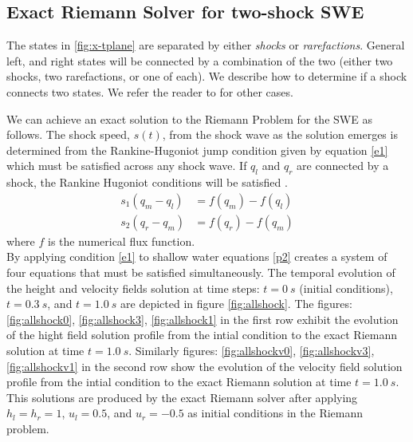 \documentclass[10pt,a4paper]{article}
\begin{document}
	

	\subsection{Exact Riemann Solver for two-shock SWE}
The states in \ref{fig:x-tplane} are separated by either {\em shocks} or {\em rarefactions}. General left, and right states will be connected by a combination of the two (either two shocks, two rarefactions, or one of each).  We describe how to determine if a shock connects two states.  We refer the reader to \cite{leveque2002finite} for other cases. 

We can achieve an exact solution to the Riemann Problem for the SWE as follows. 
The shock speed, $s(t)$,  from the shock wave as the solution emerges is determined from the Rankine-Hugoniot jump condition given by equation \eqref{e1}  which must be satisfied across any shock wave.  If $q_l$ and $q_r$ are connected by a shock, the Rankine Hugoniot conditions will be satisfied \cite{ma-ah-be-ca-ge-ha-ke-le-le:2016}. 
	\begin{equation}
		\begin{aligned}
			s_1(q_{m} - q_{l}) & = f(q_{m}) - f(q_{l}) \\
			s_2(q_{r} - q_{m}) & = f(q_{r}) - f(q_{m})
		\end{aligned}
		\label{e1}
	\end{equation}
where $f$ is the numerical flux function. \\

By applying condition  \eqref{e1} to shallow water equations \eqref{p2}  creates a system of four equations that must be satisfied simultaneously. The temporal evolution of the height and velocity fields solution at time steps: $t=0~s$ (initial conditions), $t = 0.3~s$, and $t = 1.0~s$ are  depicted in figure \ref{fig:allshock}. The figures: \ref{fig:allshock0}, \ref{fig:allshock3}, \ref{fig:allshock1} in the first row exhibit the evolution of the hight field solution profile from the intial condition to the exact Riemann solution at time $t = 1.0~s$. Similarly figures: \ref{fig:allshockv0}, \ref{fig:allshockv3}, \ref{fig:allshockv1} in the second row show the evolution of the velocity field solution profile from the intial condition to the exact Riemann solution at time $t = 1.0~s$. This solutions are produced by the exact Riemann solver after applying $h_l = h_r = 1$, $u_l  =  0.5$, and $u_r = -0.5$ as initial conditions in  the Riemann problem.
	
\end{document}
